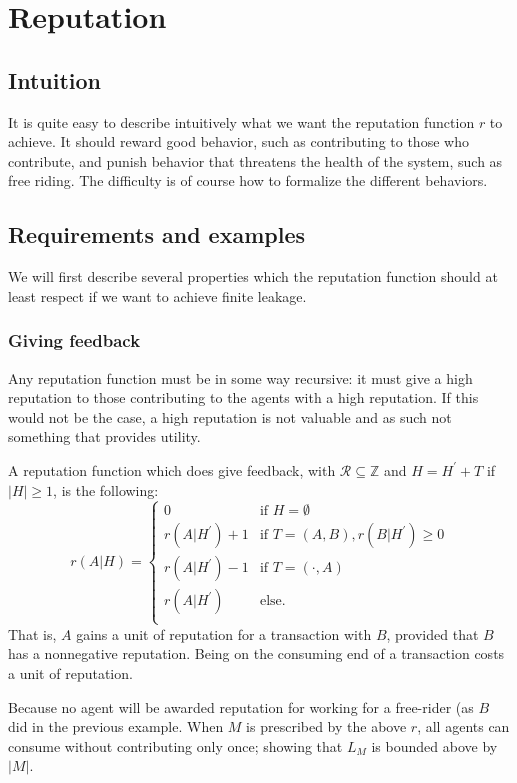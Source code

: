 \chapter{Reputation}\label{chapter:reputation}
\section{Intuition}
It is quite easy to describe intuitively what we want the reputation function $r$ to achieve. 
It should reward good behavior, 
such as contributing to those who contribute, 
and punish behavior that threatens the health of the system, 
such as free riding. 
The difficulty is of course how to formalize the different behaviors.

\section{Requirements and examples}\label{section:requirements_reputation}
We will first describe several properties which the reputation function should at least respect if we want to achieve finite leakage. 

\subsection{Giving feedback}
Any reputation function must be in some way recursive: it must give a high reputation to those contributing to the agents with a high reputation. If this would not be the case, a high reputation is not valuable and as such not something that provides utility.

A reputation function which does give feedback, with $\mathcal{R} \subseteq \mathds{Z}$ and $H = H^\prime + T$ if $|H| \geq 1$, is the following:
\[ r(A|H) = \begin{cases}
0 & \text{if } H = \emptyset\\
r(A|H^\prime) + 1 & \text{if } T = (A, B), r(B|H^\prime) \geq 0\\
r(A|H^\prime) - 1 & \text{if } T = (\cdot, A)\\
r(A|H^\prime) & \text{else}.\\ 
\end{cases} \]
That is, $A$ gains a unit of reputation for a transaction with $B$, provided that $B$ has a nonnegative reputation. Being on the consuming end of a transaction costs a unit of reputation.

Because no agent will be awarded reputation for working for a free-rider (as $B$ did in the previous example. When $M$ is prescribed by the above $r$, all agents can consume without contributing only once; showing that $L_M$ is bounded above by $|M|$.

